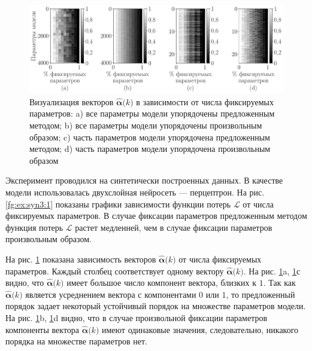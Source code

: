 \begin{figure}[h!t]\center
\includegraphics[width=1\textwidth]{results/order/generate_data_neural_matshow}
\caption{Визуализация векторов $\hat{\bm{\alpha}}\bigr(k\bigr)$ в зависимости от числа фиксируемых параметров: a) все параметры модели упорядочены предложенным методом; b) все параметры модели упорядочены произвольным образом; c) часть параметров модели упорядочена предложенным методом; d) часть параметров модели упорядочена произвольным образом}
\label{fg:ex:syn3:2}
\end{figure}

Эксперимент проводился на синтетически построенных данных. В качестве модели использовалась двухслойная нейросеть --- перцептрон.
На рис. \ref{fg:ex:syn3:1} показаны графики зависимости функции потерь $\mathcal{L}$ от числа фиксируемых параметров. В случае фиксации параметров предложенным методом функция потерь $\mathcal{L}$ растет медленней, чем в случае фиксации параметров произвольным образом.

На рис. \ref{fg:ex:syn3:2} показана зависимость векторов $\hat{\bm{\alpha}}\bigr(k\bigr)$ от числа фиксируемых параметров. Каждый столбец соответствует одному вектору $\hat{\bm{\alpha}}\bigr(k\bigr)$. На рис. \ref{fg:ex:syn3:2}a, \ref{fg:ex:syn3:2}с видно, что $\hat{\bm{\alpha}}\bigr(k\bigr)$ имеет большое число компонент вектора, близких к $1$. Так как $\hat{\bm{\alpha}}\bigr(k\bigr)$ является усреднением вектора с компонентами $0$ или $1$, то предложенный порядок задает некоторый устойчивый порядок на множестве параметров модели. На рис. \ref{fg:ex:syn3:2}b, \ref{fg:ex:syn3:2}d видно, что в случае произвольной фиксации параметров компоненты вектора $\hat{\bm{\alpha}}\bigr(k\bigr)$ имеют одинаковые значения, следовательно, никакого порядка на множестве параметров нет.


